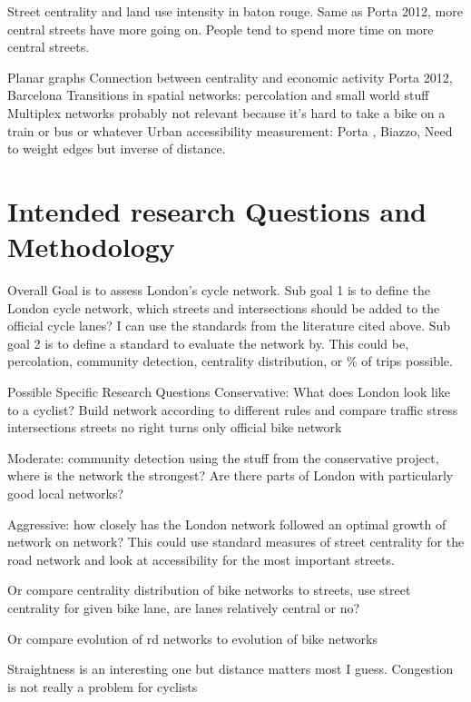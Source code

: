 \documentclass[11pt]{article} %
\begin{document}
Street centrality and land use intensity in baton rouge. Same as Porta 2012, more central streets have more going on. People tend to spend more time on more central streets. 
\cite{wang2011street}

Planar graphs
Connection between centrality and economic activity
	Porta 2012, Barcelona
Transitions in spatial networks: percolation and small world stuff
Multiplex networks probably not relevant because it's hard to take a bike on a train or bus or whatever
	Urban accessibility measurement: Porta , Biazzo, Need to weight edges but inverse of distance.


\section{Intended research Questions and Methodology}

Overall Goal is to assess London's cycle network. 
	Sub goal 1 is to define the London cycle network, which streets and intersections should be added to the official cycle lanes? I can use the standards from the literature cited above. 
	Sub goal 2 is to define a standard to evaluate the network by. This could be, percolation, community detection, centrality distribution, or \% of trips possible.   

Possible Specific Research Questions
	Conservative: What does London look like to a cyclist? Build network according to different rules and compare
		traffic stress
			intersections
			streets
		no right turns
		only official bike network
			
			
	Moderate: community detection using the stuff from the conservative project, where is the network the strongest? Are there parts of London with particularly good local networks? 
	
	
	Aggressive: how closely has the London network followed an optimal growth of network on network? 
		This could use standard measures of street centrality for the road network and look at accessibility for the most important streets.  
		
		
		Or compare centrality distribution of bike networks to streets, use street centrality for given bike lane, are lanes relatively central or no? 
		
		Or compare evolution of rd networks to evolution of bike networks
		
Straightness is an interesting one but distance matters most I guess. 
Congestion is not really a problem for cyclists
\end{document}
